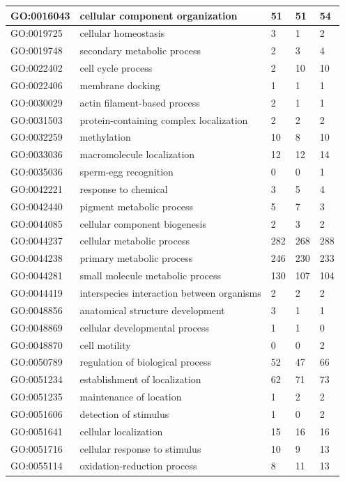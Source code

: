 \documentclass[12pt]{article}
\begin{document}
\begin{longtable}{ | p{2.2cm} | p{4cm} |p{2cm} | p{2cm} | p{2cm} | }
 \hline 
GO:0016043&cellular component organization&51&51&54\\ 
 \hline 
GO:0019725&cellular homeostasis&3&1&2\\ 
 \hline 
GO:0019748&secondary metabolic process&2&3&4\\ 
 \hline 
GO:0022402&cell cycle process&2&10&10\\ 
 \hline 
GO:0022406&membrane docking&1&1&1\\ 
 \hline 
GO:0030029&actin filament-based process&2&1&1\\ 
 \hline 
GO:0031503&protein-containing complex localization&2&2&2\\ 
 \hline 
GO:0032259&methylation&10&8&10\\ 
 \hline 
GO:0033036&macromolecule localization&12&12&14\\ 
 \hline 
GO:0035036&sperm-egg recognition&0&0&1\\ 
 \hline 
GO:0042221&response to chemical&3&5&4\\ 
 \hline 
GO:0042440&pigment metabolic process&5&7&3\\ 
 \hline 
GO:0044085&cellular component biogenesis&2&3&2\\ 
 \hline 
GO:0044237&cellular metabolic process&282&268&288\\ 
 \hline 
GO:0044238&primary metabolic process&246&230&233\\ 
 \hline 
GO:0044281&small molecule metabolic process&130&107&104\\ 
 \hline 
GO:0044419&interspecies interaction between organisms&2&2&2\\ 
 \hline 
GO:0048856&anatomical structure development&3&1&1\\ 
 \hline 
GO:0048869&cellular developmental process&1&1&0\\ 
 \hline 
GO:0048870&cell motility&0&0&2\\ 
 \hline 
GO:0050789&regulation of biological process&52&47&66\\ 
 \hline 
GO:0051234&establishment of localization&62&71&73\\ 
 \hline 
GO:0051235&maintenance of location&1&2&2\\ 
 \hline 
GO:0051606&detection of stimulus&1&0&2\\ 
 \hline 
GO:0051641&cellular localization&15&16&16\\ 
 \hline 
GO:0051716&cellular response to stimulus&10&9&13\\ 
 \hline 
GO:0055114&oxidation-reduction process&8&11&13\\ 

\end{longtable}
\end{document}
